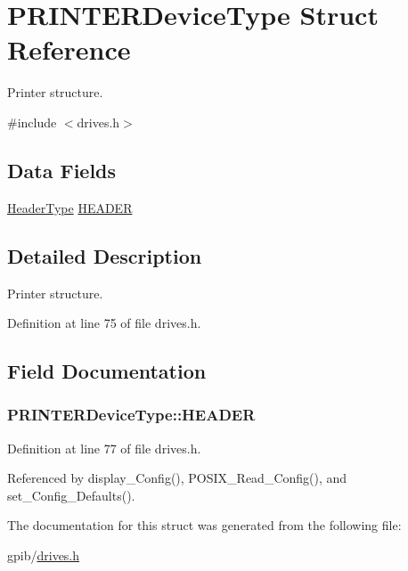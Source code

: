 \hypertarget{structPRINTERDeviceType}{}\section{P\+R\+I\+N\+T\+E\+R\+Device\+Type Struct Reference}
\label{structPRINTERDeviceType}


Printer structure.  




{\ttfamily \#include $<$drives.\+h$>$}

\subsection*{Data Fields}
\begin{DoxyCompactItemize}
\item 
\hyperlink{structHeaderType}{Header\+Type} \hyperlink{structPRINTERDeviceType_ac1ae5b29520f726e4aaab0232ecd6463}{H\+E\+A\+D\+ER}
\end{DoxyCompactItemize}


\subsection{Detailed Description}
Printer structure. 

Definition at line 75 of file drives.\+h.



\subsection{Field Documentation}
\subsubsection[{\texorpdfstring{H\+E\+A\+D\+ER}{HEADER}}]{ P\+R\+I\+N\+T\+E\+R\+Device\+Type\+::\+H\+E\+A\+D\+ER}\hypertarget{structPRINTERDeviceType_ac1ae5b29520f726e4aaab0232ecd6463}{}\label{structPRINTERDeviceType_ac1ae5b29520f726e4aaab0232ecd6463}


Definition at line 77 of file drives.\+h.



Referenced by display\+\_\+\+Config(), P\+O\+S\+I\+X\+\_\+\+Read\+\_\+\+Config(), and set\+\_\+\+Config\+\_\+\+Defaults().



The documentation for this struct was generated from the following file\+:\begin{DoxyCompactItemize}
\item 
gpib/\hyperlink{drives_8h}{drives.\+h}\end{DoxyCompactItemize}
